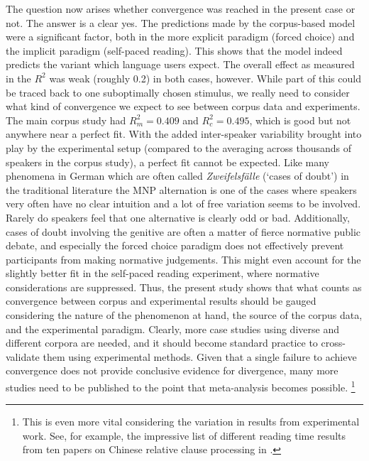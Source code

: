 The question now arises whether convergence was reached in the present case or not.
The answer is a clear yes.
The predictions made by the corpus-based model were a significant factor, both in the more explicit paradigm (forced choice) and the implicit paradigm (self-paced reading).
This shows that the model indeed predicts the variant which language users expect.
The overall effect as measured in the $R^2$ was weak (roughly 0.2) in both cases, however.
While part of this could be traced back to one suboptimally chosen stimulus, we really need to consider what kind of convergence we expect to see between corpus data and experiments.
The main corpus study had $R^2_m=0.409$ and $R^2_c=0.495$, which is good but not anywhere near a perfect fit.
With the added inter-speaker variability brought into play by the experimental setup (compared to the averaging across thousands of speakers in the corpus study), a perfect fit cannot be expected.
Like many phenomena in German which are often called \textit{Zweifelsfälle} (`cases of doubt') in the traditional literature \citep{Duden09,Klein2009} the MNP alternation is one of the cases where speakers very often have no clear intuition and a lot of free variation seems to be involved.
Rarely do speakers feel that one alternative is clearly odd or bad.
Additionally, cases of doubt involving the genitive are often a matter of fierce normative public debate, and especially the forced choice paradigm does not effectively prevent participants from making normative judgements.
This might even account for the slightly better fit in the self-paced reading experiment, where normative considerations are suppressed.
Thus, the present study shows that what counts as convergence between corpus and experimental results should be gauged considering the nature of the phenomenon at hand, the source of the corpus data, and the experimental paradigm.
Clearly, more case studies using diverse and different corpora are needed, and it should become standard practice to cross-validate them using experimental methods.
Given that a single failure to achieve convergence does not provide conclusive evidence for divergence, many more studies need to be published to the point that meta-analysis becomes possible.%
\footnote{This is even more vital considering the variation in results from experimental work.
See, for example, the impressive list of different reading time results from ten papers on Chinese relative clause processing in \citet[8]{Vasishth2015}.}


